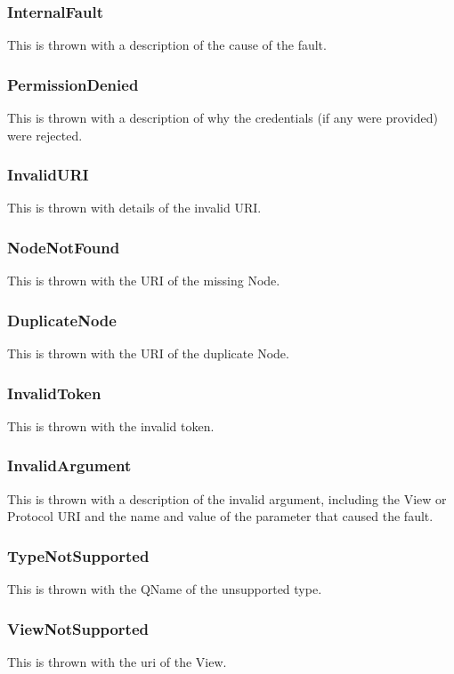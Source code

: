 \documentclass[11pt,a4paper]{ivoa}
\begin{document}
\subsubsection{InternalFault}
This is thrown with a description of the cause of the fault.

\subsubsection{PermissionDenied}
This is thrown with a description of why the credentials (if any were provided) were rejected.

\subsubsection{InvalidURI}
This is thrown with details of the invalid URI.

\subsubsection{NodeNotFound}
This is thrown with the URI of the missing Node.

\subsubsection{DuplicateNode}
This is thrown with the URI of the duplicate Node.

\subsubsection{InvalidToken}
This is thrown with the invalid token.

\subsubsection{InvalidArgument}
This is thrown with a description of the invalid argument, including the View or Protocol URI and the name and value of the parameter that caused the fault.

\subsubsection{TypeNotSupported}
This is thrown with the QName of the unsupported type.

\subsubsection{ViewNotSupported}
This is thrown with the uri of the View.
\end{document}
